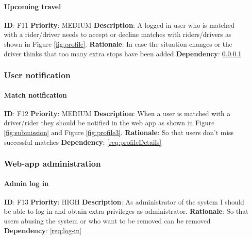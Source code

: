 \documentclass{article}
\begin{document}
\paragraph{Upcoming travel}\label{req:upcomingTravel}
\textbf{ID}: F11\newline
\textbf{Priority}: MEDIUM\newline
\textbf{Description}: A logged in user who is matched with a rider/driver needs to accept or decline matches with riders/drivers as shown in Figure \ref{fig:profile}. \newline
\textbf{Rationale}: In case the situation changes or the driver thinks that too many extra stops have been added\newline
\textbf{Dependency}: \ref{req:upcomingTravel}\newline

\subsubsection{User notification}

\paragraph{Match notification}\label{req:matchNotification}
\textbf{ID}: F12\newline
\textbf{Priority}: MEDIUM\newline
\textbf{Description}: When a user is matched with a driver/rider they should be notified in the web app as shown in Figure \ref{fig:submission} and Figure \ref{fig:profile3}. \newline
\textbf{Rationale}: So that users don't miss successful matches\newline
\textbf{Dependency}: \ref{req:profileDetails}\newline

\subsubsection{Web-app administration}

\paragraph{Admin log in}\label{req:adminLog-in}
\textbf{ID}: F13\newline
\textbf{Priority}: HIGH\newline
\textbf{Description}: As administrator of the system I should be able to log in and obtain extra privileges as administrator. \newline
\textbf{Rationale}: So that users abusing the system or who want to be removed can be removed\newline
\textbf{Dependency}: \ref{req:log-in}\newline
\end{document}
